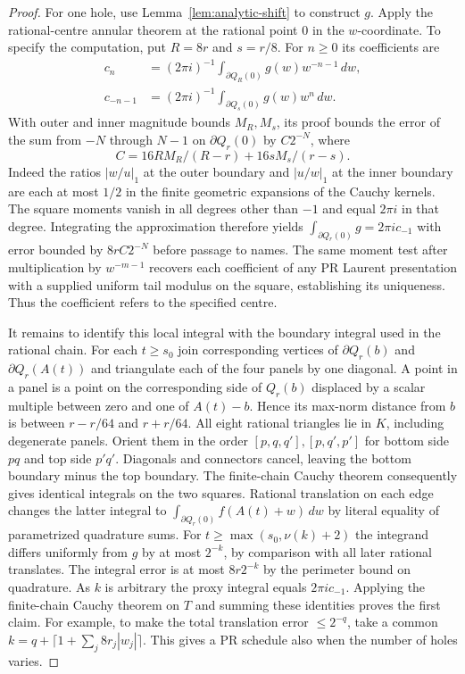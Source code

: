 \begin{proof}
For one hole, use Lemma~\ref{lem:analytic-shift} to construct $g$.
Apply the rational-centre annular theorem at the rational point $0$
in the $w$-coordinate. To specify the computation, put $R=8r$ and
$s=r/8$. For $n\ge0$ its coefficients are
\begin{align*}
 c_n &=(2\pi i)^{-1}\int_{\partial Q_R(0)}g(w)w^{-n-1}\,dw,\\
 c_{-n-1}&=(2\pi i)^{-1}\int_{\partial Q_s(0)}g(w)w^n\,dw .
\end{align*}
With outer and inner magnitude bounds $M_R,M_s$, its proof bounds the
error of the sum from $-N$ through $N-1$ on $\partial Q_r(0)$ by
$C2^{-N}$, where
\[
 C=16RM_R/(R-r)+16sM_s/(r-s).
\]
Indeed the ratios $|w/u|_1$ at the outer boundary and $|u/w|_1$ at the
inner boundary are each at most $1/2$ in the finite geometric expansions
of the Cauchy kernels. The square moments vanish in all degrees other than
$-1$ and equal $2\pi i$ in that degree. Integrating the approximation
therefore yields $\int_{\partial Q_r(0)}g=2\pi i c_{-1}$ with error
bounded by $8rC2^{-N}$ before passage to names. The same moment test
after multiplication by $w^{-m-1}$ recovers each coefficient of any
PR Laurent presentation with a supplied uniform tail modulus on the square, establishing
its uniqueness. Thus the coefficient refers to the specified centre.

It remains to identify this local integral with the boundary integral
used in the rational chain. For each $t\ge s_0$ join corresponding
vertices of $\partial Q_r(b)$ and $\partial Q_r(A(t))$ and triangulate
each of the four panels by one diagonal. A point in a panel is a point
on the corresponding side of $Q_r(b)$ displaced by a scalar multiple
between zero and one of $A(t)-b$. Hence its max-norm distance from $b$
is between $r-r/64$ and $r+r/64$. All eight rational triangles lie in
$K$, including degenerate panels. Orient them in the order
$[p,q,q'],[p,q',p']$ for bottom side $p q$ and top side $p'q'$.
Diagonals and connectors cancel, leaving the bottom boundary minus
the top boundary. The finite-chain Cauchy theorem consequently gives
identical integrals on the two squares. Rational translation on each
edge changes the latter integral to
$\int_{\partial Q_r(0)} f(A(t)+w)\,dw$ by literal equality of
parametrized quadrature sums. For $t\ge\max(s_0,\nu(k)+2)$ the
integrand differs uniformly from $g$ by at most $2^{-k}$, by comparison
with all later rational translates. The integral error is at most
$8r2^{-k}$ by the perimeter bound on quadrature. As $k$ is arbitrary
the proxy integral equals $2\pi i c_{-1}$. Applying the finite-chain
Cauchy theorem on $T$ and summing these identities proves the first
claim. For example, to make the total translation error $\le2^{-q}$,
take a common $k=q+\lceil1+\sum_j8r_j|w_j|\rceil$. This gives a
PR schedule also when the number of holes varies.


\end{proof}
